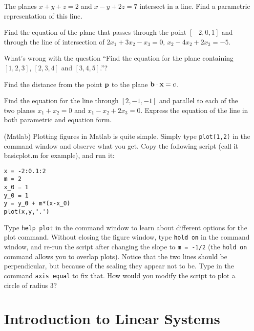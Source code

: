\begin{problem}
\label{2009_a2_5}
The planes $x+y+z = 2$ and $x-y+2z=7$ intersect in a line. Find
a parametric representation of this line. 
\end{problem}

\begin{problem}
\label{op1_29}
Find the equation of the plane that passes through the point $[-2,0,1]$ and
through the line of intersection of $2x_1+3x_2-x_3=0$, $x_2-4x_2+2x_3=-5$.
\end{problem}

\begin{problem}
\label{op1_30}
What's wrong with the question ``Find the equation for the plane containing 
$[1,2,3]$, $[2,3,4]$ and $[3,4,5]$.''?
\end{problem}

\begin{problem}
\label{op1_31}
Find the distance from the point ${\bf p}$ to the plane ${\bf b}\cdot{\bf x}=c$.
\end{problem}

\begin{problem}
\label{op1_32}
Find the equation for the line through $[2,-1,-1]$ and parallel to each of the
two planes $x_1+x_2=0$ and $x_1-x_2+2x_3=0$. Express the equation of the line
in both parametric and equation form.
\end{problem}

\begin{problem}
\label{matlab_op1_36}
(Matlab) Plotting figures in Matlab is quite simple. Simply type {\tt plot(1,2)} in the command window and observe what you get. Copy the following script (call it basicplot.m for example), and run it:
\begin{verbatim}
x = -2:0.1:2
m = 2
x_0 = 1
y_0 = 1
y = y_0 + m*(x-x_0)
plot(x,y,'.')
\end{verbatim}
Type {\tt help plot} in the command window to learn about different options for the plot command. Without closing the figure window, type {\tt hold on} in the command window, and re-run the script after changing the slope to {\tt m = -1/2} (the {\tt hold on} command allows you to overlap plots). Notice that the two lines should be perpendicular, but because of the scaling they appear not to be. Type in the command {\tt axis equal} to fix that. How would you modify the script to plot a circle of radius 3?

\end{problem}

\section{Introduction to Linear Systems}


